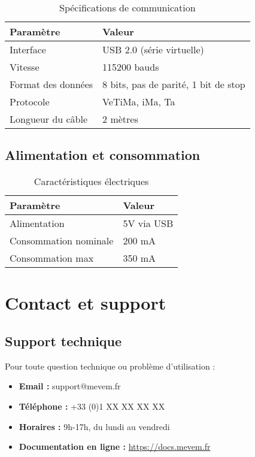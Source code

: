\documentclass[12pt,a4paper]{article}
\begin{document}
\begin{table}[H]
\centering
\begin{tabular}{|l|l|}
\hline
\textbf{Paramètre} & \textbf{Valeur} \\
\hline
Interface & USB 2.0 (série virtuelle) \\
\hline
Vitesse & 115200 bauds \\
\hline
Format des données & 8 bits, pas de parité, 1 bit de stop \\
\hline
Protocole & VeTiMa, iMa, Ta \\
\hline
Longueur du câble & 2 mètres \\
\hline
\end{tabular}
\caption{Spécifications de communication}
\label{tab:specs_comm}
\end{table}

\subsection{Alimentation et consommation}

\begin{table}[H]
\centering
\begin{tabular}{|l|l|}
\hline
\textbf{Paramètre} & \textbf{Valeur} \\
\hline
Alimentation & 5V via USB \\
\hline
Consommation nominale & 200 mA \\
\hline
Consommation max & 350 mA \\
\hline
\end{tabular}
\caption{Caractéristiques électriques}
\label{tab:specs_elec}
\end{table}

\section{Contact et support}

\subsection{Support technique}

Pour toute question technique ou problème d'utilisation :

\begin{itemize}
    \item \textbf{Email :} support@mevem.fr
    \item \textbf{Téléphone :} +33 (0)1 XX XX XX XX
    \item \textbf{Horaires :} 9h-17h, du lundi au vendredi
    \item \textbf{Documentation en ligne :} \url{https://docs.mevem.fr}
\end{itemize}
\end{document}
